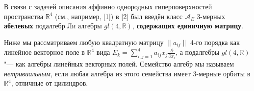 
\vzmscaption

В связи с задачей описания аффинно однородных гиперповерхностей пространства $\mathbb{R}^4$ (см., например, [1]) в [2] был введён класс $\mathcal{A}_E$ 3-мерных \textbf{абелевых} подалгебр Ли алгебры $gl(4,\mathbb{R})$,  \textbf{содержащих единичную матрицу}.

Ниже мы рассматриваем любую квадратную матрицу $ \|a_{ij}\| $ 4-го порядка как линейное векторное поле в $\mathbb{R}^4 $ вида $E_k = \sum_{i,j =1 }^4 {a_{ij} x_j} \frac{\partial}{\partial x_i}$, а подалгебры $gl(4,\mathbb{R})$ "---  как алгебры линейных векторных полей. Семейство алгебр мы называем \textit{нетривиальным}, если любая алгебра из этого семейства имеет 3-мерные орбиты в $\mathbb{R}^4$, отличные от цилиндров.



